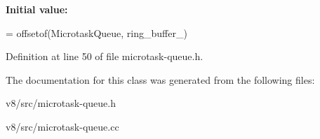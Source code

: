 {\bfseries Initial value\+:}
\begin{DoxyCode}
=
    offsetof(MicrotaskQueue, ring\_buffer\_)
\end{DoxyCode}


Definition at line 50 of file microtask-\/queue.\+h.



The documentation for this class was generated from the following files\+:\begin{DoxyCompactItemize}
\item 
v8/src/microtask-\/queue.\+h\item 
v8/src/microtask-\/queue.\+cc\end{DoxyCompactItemize}
